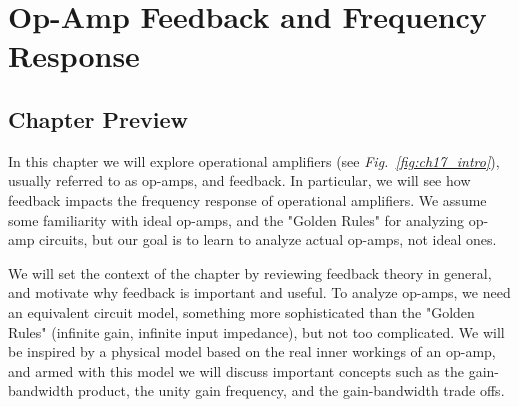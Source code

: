 \chapter{Op-Amp Feedback and Frequency Response}
\label{ch:ch17_opamps_fb}
\graphicspath{{./figures/figs_ch17_opamps_fb/}}
\section{Chapter Preview}
In this chapter we will explore operational amplifiers (see \emph{Fig.~\ref{fig:ch17_intro}}), usually referred to as op-amps, and feedback.  In particular, we will see how feedback impacts the frequency response of operational amplifiers.  We assume some familiarity with ideal op-amps, and the "Golden Rules" for analyzing op-amp circuits, but our goal is to learn to analyze actual op-amps, not ideal ones.

We will set the context of the chapter by reviewing feedback theory in general, and motivate why feedback is important and useful.  To analyze op-amps, we need an equivalent circuit model, something more sophisticated than the "Golden Rules" (infinite gain, infinite input impedance), but not too complicated.   We will be inspired by a physical model based on the real inner workings of an op-amp, and armed with this model we will discuss important concepts such as the gain-bandwidth product, the unity gain frequency, and the gain-bandwidth trade offs.

